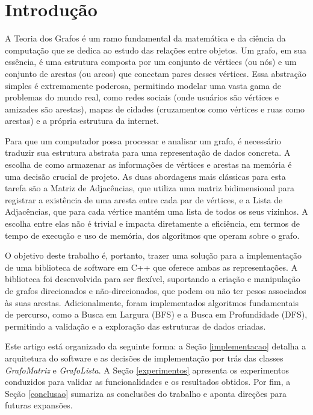 \documentclass{sbc2023}%
\begin{document}
\section{Introdução}
\label{introducao}
A Teoria dos Grafos é um ramo fundamental da matemática e da ciência da computação que se dedica ao estudo das relações entre objetos. Um grafo, em sua essência, é uma estrutura composta por um conjunto de vértices (ou nós) e um conjunto de arestas (ou arcos) que conectam pares desses vértices. Essa abstração simples é extremamente poderosa, permitindo modelar uma vasta gama de problemas do mundo real, como redes sociais (onde usuários são vértices e amizades são arestas), mapas de cidades (cruzamentos como vértices e ruas como arestas) e a própria estrutura da internet. ~\citep{sedgewick2002algorithms}

Para que um computador possa processar e analisar um grafo, é necessário traduzir sua estrutura abstrata para uma representação de dados concreta. A escolha de como armazenar as informações de vértices e arestas na memória é uma decisão crucial de projeto. As duas abordagens mais clássicas para esta tarefa são a Matriz de Adjacências, que utiliza uma matriz bidimensional para registrar a existência de uma aresta entre cada par de vértices, e a Lista de Adjacências, que para cada vértice mantém uma lista de todos os seus vizinhos. A escolha entre elas não é trivial e impacta diretamente a eficiência, em termos de tempo de execução e uso de memória, dos algoritmos que operam sobre o grafo.

O objetivo deste trabalho é, portanto, trazer uma solução para a  implementação de uma biblioteca de software em C++ que oferece ambas as representações. A biblioteca foi desenvolvida para ser flexível, suportando a criação e manipulação de grafos direcionados e não-direcionados, que podem ou não ter pesos associados às suas arestas. Adicionalmente, foram implementados algoritmos fundamentais de percurso, como a Busca em Largura (BFS) e a Busca em Profundidade (DFS), permitindo a validação e a exploração das estruturas de dados criadas.

Este artigo está organizado da seguinte forma: a Seção \ref{implementacao} detalha a arquitetura do software e as decisões de implementação por trás das classes \textit{GrafoMatriz} e \textit{GrafoLista}. A Seção \ref{experimentos} apresenta os experimentos conduzidos para validar as funcionalidades e os resultados obtidos. Por fim, a Seção \ref{conclusao} sumariza as conclusões do trabalho e aponta direções para futuras expansões. 
\end{document}
